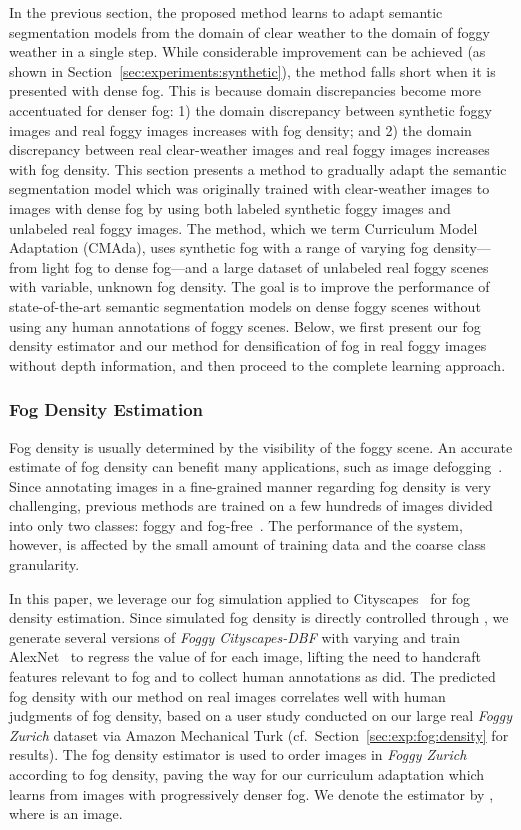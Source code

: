 \documentclass[twocolumn]{svjour3}          \smartqed  \usepackage{graphicx}
\begin{document}
In the previous section, the proposed method learns to adapt semantic segmentation models from the domain of clear weather to the domain of foggy weather in a single step. While considerable improvement can be achieved (as shown in Section~\ref{sec:experiments:synthetic}), the method falls short when it is presented with dense fog. This is because domain discrepancies become more accentuated for denser fog: 1) the domain discrepancy between synthetic foggy images and real foggy images increases with fog density; and 2) the domain discrepancy between real clear-weather images and real foggy images increases with fog density. This section presents a method to gradually adapt the semantic segmentation model which was originally trained with clear-weather images to images with dense fog by using both labeled synthetic foggy images and unlabeled real foggy images. The method, which we term Curriculum Model Adaptation (CMAda), uses synthetic fog with a range of varying fog density---from light fog to dense fog---and a large dataset of unlabeled real foggy scenes with variable, unknown fog density. The goal is to improve the performance of state-of-the-art semantic segmentation models on dense foggy scenes without using any human annotations of foggy scenes. Below, we first present our fog density estimator and our method for densification of fog in real foggy images without depth information, and then proceed to the complete learning approach. 

\subsubsection{Fog Density Estimation}
\label{sec:fog:density:estimation}
Fog density is usually determined by the visibility of the foggy scene. An accurate estimate of fog density can benefit many applications, such as image defogging~\cite{fog:density:15}. Since annotating images in a fine-grained manner regarding fog density is very challenging, previous methods are trained on a few hundreds of images divided into only two classes: foggy and fog-free~\cite{fog:density:15}. The performance of the system, however, is affected by the small amount of training data and the coarse class granularity.

In this paper, we leverage our fog simulation applied to Cityscapes~\cite{Cityscapes} for fog density estimation. Since simulated fog density is directly controlled through , we generate several versions of \emph{Foggy Cityscapes-DBF} with varying  and train AlexNet~\cite{alexnet} to regress the value of  for each image, lifting the need to handcraft features relevant to fog and to collect human annotations as \cite{fog:density:15} did. The predicted fog density with our method on real images correlates well with human judgments of fog density, based on a user study conducted on our large real \emph{Foggy Zurich} dataset via Amazon Mechanical Turk (cf.\ Section~\ref{sec:exp:fog:density} for results). The fog density estimator is used to order images in \emph{Foggy Zurich} according to fog density, paving the way for our curriculum adaptation which learns from images with progressively denser fog. We denote the estimator by , where  is an image. 
\end{document}
